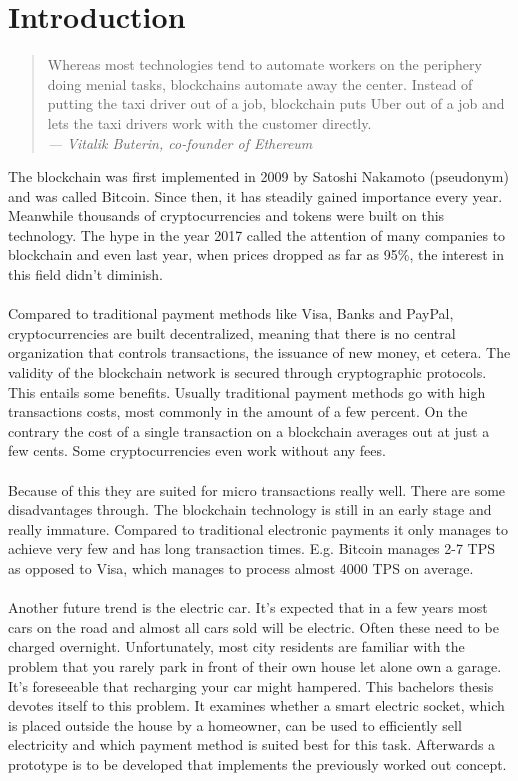 \section{Introduction}
\begin{quote}
  Whereas most technologies tend to automate workers on the periphery doing menial tasks, blockchains automate away the center. Instead of putting the taxi driver out of a job, blockchain puts Uber out of a job and lets the taxi drivers work with the customer directly.
  \\
  {\textit{— Vitalik Buterin, co-founder of Ethereum}}
\end{quote}


The blockchain was first implemented in 2009 by Satoshi Nakamoto (pseudonym) and was called Bitcoin. Since then, it has steadily gained importance every year. Meanwhile thousands of cryptocurrencies and tokens were built on this technology. The hype in the year 2017 called the attention of many companies to blockchain and even last year, when prices dropped as far as 95\%, the interest in this field didn’t diminish.\\\\
Compared to traditional payment methods like Visa, Banks and PayPal, cryptocurrencies are built decentralized, meaning that there is no central organization that controls transactions, the issuance of new money, et cetera. The validity of the blockchain  network is secured through cryptographic protocols. This entails some benefits. Usually traditional payment methods go with high transactions costs, most commonly in the amount of a few percent. On the contrary the cost of a single transaction on a blockchain averages out at just a few cents\cite{introTimestamp}. Some cryptocurrencies even work without any fees.\\\\
Because of this they are suited for micro transactions really well. There are some disadvantages through. The blockchain technology is still in an early stage and really immature. Compared to traditional electronic payments it only manages to achieve very few  and has long transaction times. E.g. Bitcoin manages 2-7 TPS\cite{introTimestamp} as opposed to Visa, which manages to process almost 4000 TPS on average\cite{visa}.\\\\
Another future trend is the electric car. It’s expected that in a few years most cars on the road and almost all cars sold will be electric. Often these need to be charged overnight. Unfortunately, most city residents are familiar with the problem that you rarely park in front of their own house let alone  own a garage. It’s foreseeable that recharging your car might hampered. This bachelors thesis devotes itself to this problem. It examines whether a smart electric socket, which is placed outside the house by a homeowner, can be used to efficiently sell electricity and which payment method is suited best for this task. Afterwards a prototype is to be developed that implements the previously worked out concept.\\\\